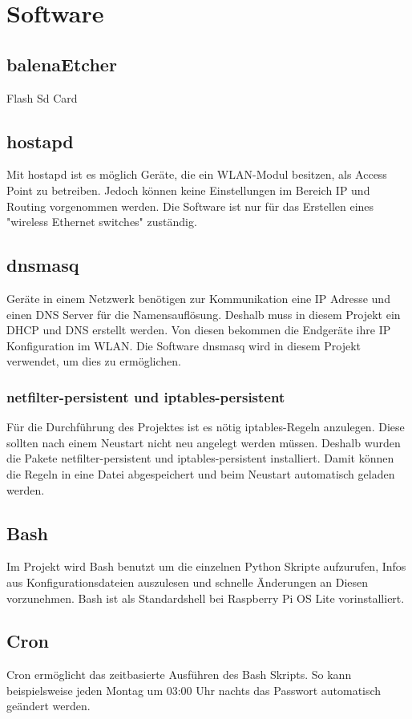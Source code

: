 \documentclass[a4paper,11pt,singlespacing]{article}
\begin{document}
    			
    	\section{Software}
    		\subsection{balenaEtcher}
    			Flash Sd Card
    		\subsection{hostapd}
        		Mit hostapd ist es möglich Geräte, die ein WLAN-Modul besitzen, als Access Point zu betreiben. Jedoch können keine Einstellungen im Bereich IP und Routing vorgenommen werden. Die Software ist nur für das Erstellen eines "wireless Ethernet switches" zuständig. \cite{Quote_hostapd1} 
    		\subsection{dnsmasq}
        		Geräte in einem Netzwerk benötigen zur Kommunikation eine IP Adresse und einen DNS Server für die Namensauflösung. Deshalb muss in diesem Projekt ein DHCP und DNS erstellt werden. Von diesen bekommen die Endgeräte ihre IP Konfiguration im WLAN. Die Software dnsmasq wird in diesem Projekt verwendet, um dies zu ermöglichen.
    		\subsubsection{netfilter-persistent und iptables-persistent}
        		Für die Durchführung des Projektes ist es nötig iptables-Regeln anzulegen. Diese sollten nach einem Neustart nicht neu angelegt werden müssen. Deshalb wurden die Pakete netfilter-persistent und iptables-persistent installiert. Damit können die Regeln in eine Datei abgespeichert und beim Neustart automatisch geladen werden.
        	\subsection{Bash}
        		Im Projekt wird Bash benutzt um die einzelnen Python Skripte aufzurufen, Infos aus Konfigurationsdateien auszulesen und schnelle Änderungen an Diesen vorzunehmen. Bash ist als Standardshell bei Raspberry Pi OS Lite vorinstalliert. 
    		\subsection{Cron}
				Cron ermöglicht das zeitbasierte Ausführen des Bash Skripts. So kann beispielsweise jeden Montag um 03:00 Uhr nachts das Passwort automatisch geändert werden. 
\end{document}
